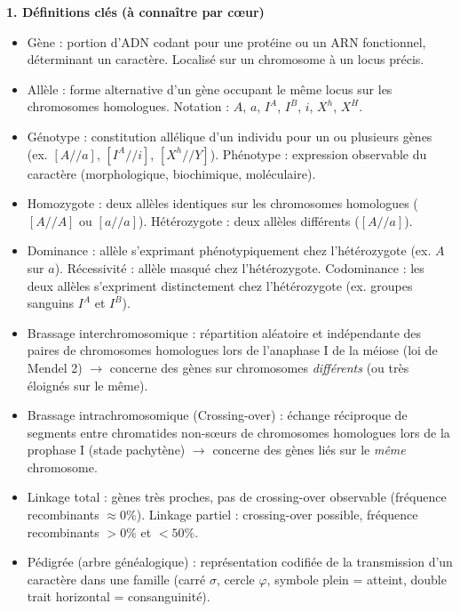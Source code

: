 \documentclass[11pt]{article}
\newcommand{\cle}[1]{{\popxbold\color{popdark}#1}}
\newcounter{popsec}
\newcounter{popsub}
\newcommand{\courssub}[1]{%
  \stepcounter{popsub}%
  \par\vspace{9pt}\noindent{\popxbold\fontsize{11.5}{13}\selectfont\color{popink}{\color{poporange}\thepopsec.\thepopsub}\hspace{6pt}#1}\par\nopagebreak\vspace{4pt}
}
\begin{document}
\courssub{Bilan des savoirs et savoir-faire}
\begin{aretenir}

\textbf{1. Définitions clés (à connaître par cœur)}
\begin{itemize}
    \item \cle{Gène} : portion d'ADN codant pour une protéine ou un ARN fonctionnel, déterminant un caractère. Localisé sur un chromosome à un \cle{locus} précis.
    \item \cle{Allèle} : forme alternative d'un gène occupant le même locus sur les chromosomes homologues. Notation : $A$, $a$, $I^{A}$, $I^{B}$, $i$, $X^{h}$, $X^{H}$.
    \item \cle{Génotype} : constitution allélique d'un individu pour un ou plusieurs gènes (ex. $[A//a]$, $[I^{A}//i]$, $[X^{h}//Y]$). \cle{Phénotype} : expression observable du caractère (morphologique, biochimique, moléculaire).
    \item \cle{Homozygote} : deux allèles identiques sur les chromosomes homologues ($[A//A]$ ou $[a//a]$). \cle{Hétérozygote} : deux allèles différents ($[A//a]$).
    \item \cle{Dominance} : allèle s'exprimant phénotypiquement chez l'hétérozygote (ex. $A$ sur $a$). \cle{Récessivité} : allèle masqué chez l'hétérozygote. \cle{Codominance} : les deux allèles s'expriment distinctement chez l'hétérozygote (ex. groupes sanguins $I^{A}$ et $I^{B}$).
    \item \cle{Brassage interchromosomique} : répartition aléatoire et indépendante des paires de chromosomes homologues lors de l'anaphase I de la méiose (loi de Mendel 2) $\rightarrow$ concerne des gènes sur chromosomes \emph{différents} (ou très éloignés sur le même).
    \item \cle{Brassage intrachromosomique (Crossing-over)} : échange réciproque de segments entre chromatides non-sœurs de chromosomes homologues lors de la prophase I (stade pachytène) $\rightarrow$ concerne des gènes \cle{liés} sur le \emph{même} chromosome.
    \item \cle{Linkage total} : gènes très proches, pas de crossing-over observable (fréquence recombinants $\approx 0\%$). \cle{Linkage partiel} : crossing-over possible, fréquence recombinants $> 0\%$ et $< 50\%$.
    \item \cle{Pédigrée (arbre généalogique)} : représentation codifiée de la transmission d'un caractère dans une famille (carré $\sigma$, cercle $\varphi$, symbole plein = atteint, double trait horizontal = consanguinité).

\end{itemize}
\end{aretenir}
\end{document}
